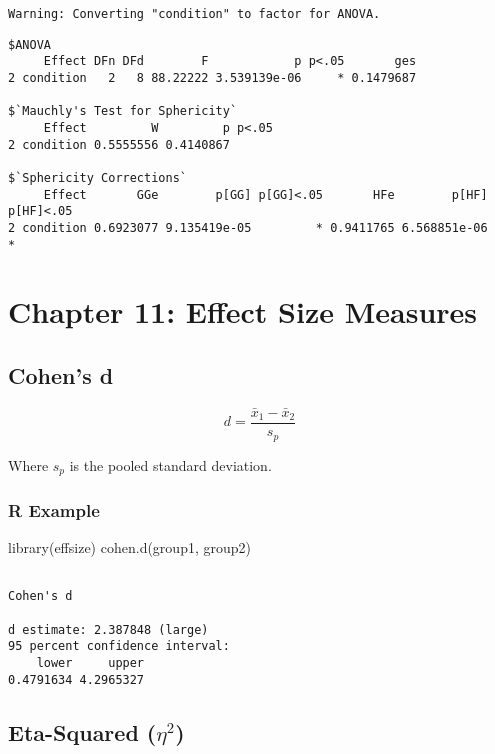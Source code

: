 \documentclass[
  letterpaper,
  DIV=11,
  numbers=noendperiod]{scrreprt}
\newenvironment{Shaded}{\begin{snugshade}}{\end{snugshade}}
\newcommand{\FunctionTok}[1]{\textcolor[rgb]{0.28,0.35,0.67}{#1}}
\newcommand{\NormalTok}[1]{\textcolor[rgb]{0.00,0.23,0.31}{#1}}
\begin{document}
\begin{verbatim}
Warning: Converting "condition" to factor for ANOVA.
\end{verbatim}

\begin{verbatim}
$ANOVA
     Effect DFn DFd        F            p p<.05       ges
2 condition   2   8 88.22222 3.539139e-06     * 0.1479687

$`Mauchly's Test for Sphericity`
     Effect         W         p p<.05
2 condition 0.5555556 0.4140867      

$`Sphericity Corrections`
     Effect       GGe        p[GG] p[GG]<.05       HFe        p[HF] p[HF]<.05
2 condition 0.6923077 9.135419e-05         * 0.9411765 6.568851e-06         *
\end{verbatim}

\section{Chapter 11: Effect Size
Measures}\label{chapter-11-effect-size-measures}

\subsection{Cohen's d}\label{cohens-d}

\[
d = \frac{\bar{x}_1 - \bar{x}_2}{s_p}
\]

Where \(s_p\) is the pooled standard deviation.

\subsubsection{R Example}\label{r-example}

\begin{Shaded}
\begin{Highlighting}[]
\FunctionTok{library}\NormalTok{(effsize)}
\FunctionTok{cohen.d}\NormalTok{(group1, group2)}
\end{Highlighting}
\end{Shaded}

\begin{verbatim}

Cohen's d

d estimate: 2.387848 (large)
95 percent confidence interval:
    lower     upper 
0.4791634 4.2965327 
\end{verbatim}

\subsection{\texorpdfstring{Eta-Squared
(\(\eta^2\))}{Eta-Squared (\textbackslash eta\^{}2)}}\label{eta-squared-eta2}
\end{document}
